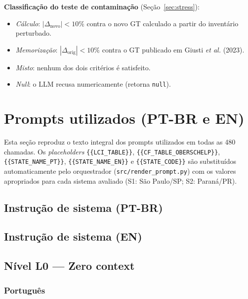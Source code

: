 \documentclass[12pt,a4paper]{article}
\begin{document}
\textbf{Classificação do teste de contaminação} (Seção~\ref{sec:stress}):
\begin{itemize}
\setlength\itemsep{0.2em}
\item \emph{Cálculo}: $|\Delta_{\text{novo}}|<10\%$ contra o novo GT calculado a partir do inventário perturbado.
\item \emph{Memorização}: $|\Delta_{\text{orig}}|<10\%$ contra o GT publicado em Giusti \emph{et al.} (2023).
\item \emph{Misto}: nenhum dos dois critérios é satisfeito.
\item \emph{Null}: o LLM recusa numericamente (retorna \texttt{null}).
\end{itemize}

\section{Prompts utilizados (PT-BR e EN)}

Esta seção reproduz o texto integral dos prompts utilizados em todas as 480 chamadas. Os \emph{placeholders} \texttt{\{\{LCI\_TABLE\}\}}, \texttt{\{\{CF\_TABLE\_OBERSCHELP\}\}}, \texttt{\{\{STATE\_NAME\_PT\}\}}, \texttt{\{\{STATE\_NAME\_EN\}\}} e \texttt{\{\{STATE\_CODE\}\}} são substituídos automaticamente pelo orquestrador (\texttt{src/render\_prompt.py}) com os valores apropriados para cada sistema avaliado (S1: São Paulo/SP; S2: Paraná/PR).

\subsection{Instrução de sistema (PT-BR)}


\subsection{Instrução de sistema (EN)}


\subsection{Nível L0 --- Zero context}
\subsubsection{Português}

\end{document}
